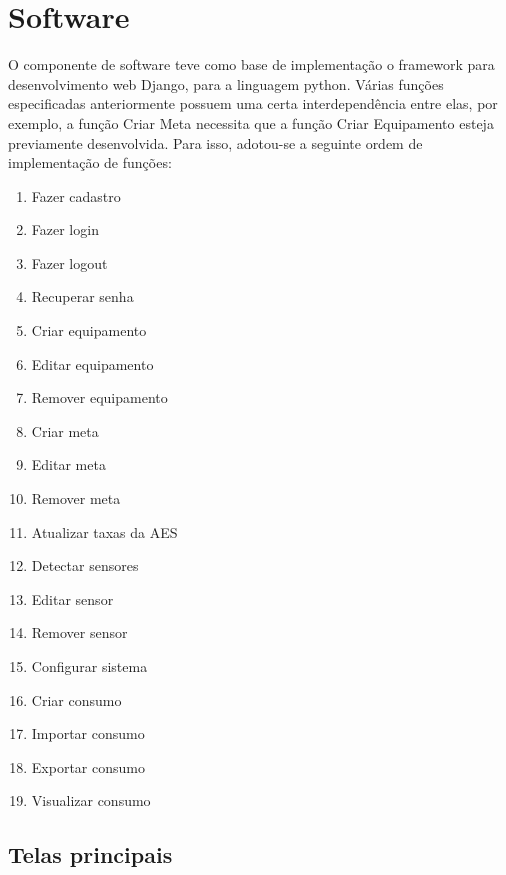 \section{Software}
\label{Sec:5-software}

O componente de software teve como base de implementação o framework para desenvolvimento web Django, para a linguagem python. Várias funções especificadas anteriormente possuem uma certa interdependência entre elas, por exemplo, a função Criar Meta necessita que a função Criar Equipamento esteja previamente desenvolvida. Para isso, adotou-se a seguinte ordem de implementação de funções:

\begin{enumerate}
	\item{Fazer cadastro}
	\item{Fazer login}
	\item{Fazer logout}
	\item{Recuperar senha}
	\item{Criar equipamento}
	\item{Editar equipamento}
	\item{Remover equipamento}
	\item{Criar meta}
	\item{Editar meta}
	\item{Remover meta}
	\item{Atualizar taxas da AES}
	\item{Detectar sensores}
	\item{Editar sensor}
	\item{Remover sensor}
	\item{Configurar sistema}
	\item{Criar consumo}
	\item{Importar consumo}
	\item{Exportar consumo}
	\item{Visualizar consumo}
\end{enumerate}

\subsection{Telas principais}
